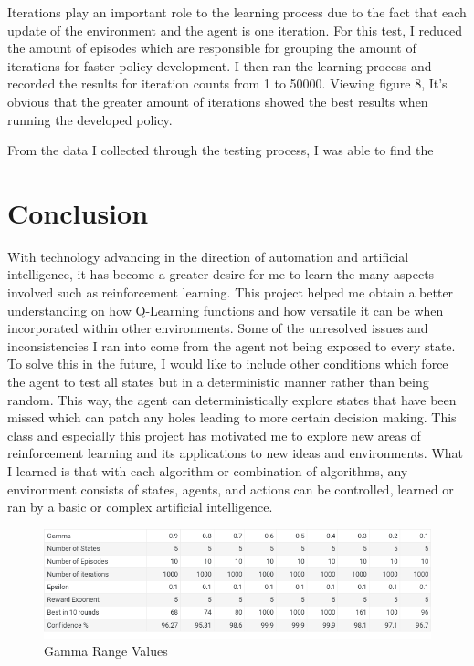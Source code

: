 \documentclass{article}
\begin{document}
Iterations play an important role to the learning process due to the fact that each update of the environment and the agent is one iteration. For this test, I reduced the amount of episodes which are responsible for grouping the amount of iterations for faster policy development. I then ran the learning process and recorded the results for iteration counts from 1 to 50000. Viewing figure 8, It's obvious that the greater amount of iterations showed the best results when running the developed policy. 

From the data I collected through the testing process, I was able to find the 
\section{Conclusion}
With technology advancing in the direction of automation and artificial intelligence, it has become a greater desire for me to learn the many aspects involved such as reinforcement learning. This project helped me obtain a better understanding on how Q-Learning functions and how versatile it can be when incorporated within other environments. Some of the unresolved issues and inconsistencies I ran into come from the agent not being exposed to every state. To solve this in the future, I would like to include other conditions which force the agent to test all states but in a deterministic manner rather than being random. This way, the agent can deterministically explore states that have been missed which can patch any holes leading to more certain decision making. This class and especially this project has motivated me to explore new areas of reinforcement learning and its applications to new ideas and environments. What I learned is that with each algorithm or combination of algorithms, any environment consists of states, agents, and actions can be controlled, learned or ran by a basic or complex artificial intelligence.

\begin{figure}[h!]
    \centering
    \includegraphics[width=1\textwidth]{figure5}
    \caption{Gamma Range Values}
    \label{fig:mesh2}
\end{figure}
\end{document}
